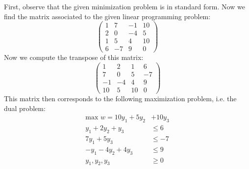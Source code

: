 \documentclass[11pt,letterpaper]{article}
\begin{document}
\sol First, observe that the given minimization problem is in standard form. Now we find the matrix associated to the given linear programming problem:
	\[
	\begin{pmatrix}
	1 & 7 & -1 & 10 \\
	2 & 0 & -4 & 5 \\
	1 & 5 & 4 & 10 \\
	6 & -7 & 9 & 0 
	\end{pmatrix}
	\]
Now we compute the transpose of this matrix:
	\[
	\begin{pmatrix}
	1 & 2 & 1 & 6 \\
	7 & 0 & 5 & -7 \\
	-1 & -4 & 4 & 9 \\
	10 & 5 & 10 & 0 
	\end{pmatrix}
	\]
This matrix then corresponds to the following maximization problem, i.e. the dual problem:
	\[
	\begin{aligned}
	\text{max } w= 10y_1 + 5y_2 &+ 10y_3 \\
	y_1 + 2y_2 + y_3&\leq 6 \\
	7y_1 + 5y_3&\leq -7 \\
	-y_1 - 4y_2 + 4y_3&\leq 9 \\
	y_1, y_2, y_3&\geq 0 
	\end{aligned}
	\]
\end{document}
